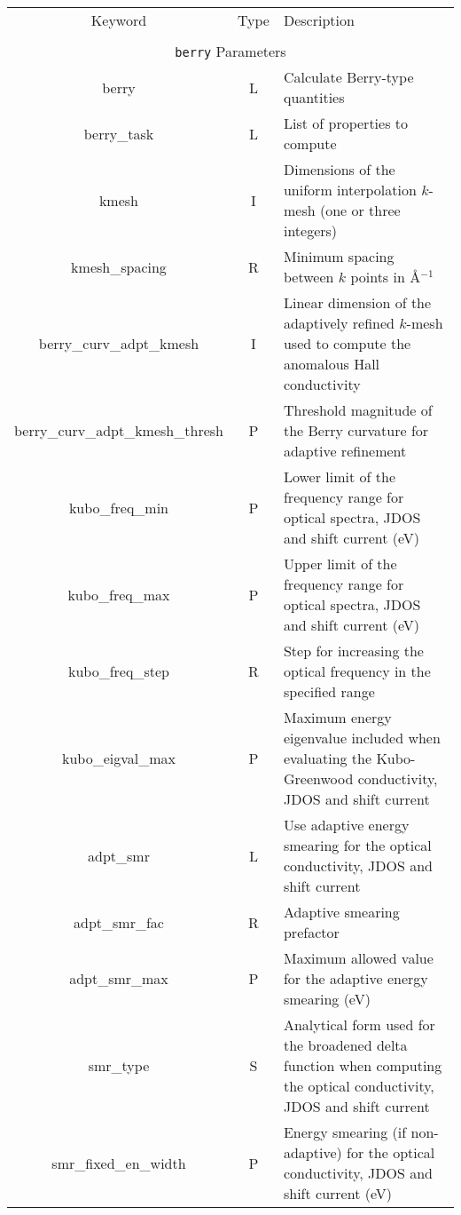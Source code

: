 \begin{table}[h!]
\begin{center}
\begin{tabular}{|c|c|p{6cm}|}
  \hline
  Keyword & Type & Description \\
  &      &             \\
  \hline\hline
  \multicolumn{3}{|c|}{{\tt berry} Parameters} \\
  \hline
  {\sc berry}  & L & Calculate Berry-type quantities \\
  {\sc berry\_task}& L  & List of properties to compute \\
  {\sc [berry\_]kmesh} & I & Dimensions of the uniform interpolation $k$-mesh 
  (one or three integers)\\ 
  {\sc [berry\_]kmesh\_spacing}& R & Minimum spacing between $k$ points in 
  \AA$^{-1}$\\
  {\sc berry\_curv\_adpt\_kmesh} & I & Linear dimension of the adaptively refined $k$-mesh used to compute the anomalous Hall conductivity\\ 
  {\sc berry\_curv\_adpt\_kmesh\_thresh} & P & Threshold magnitude
  of the Berry curvature for adaptive refinement\\ 
  {\sc kubo\_freq\_min} & P & Lower limit of the frequency range for
  optical spectra, JDOS and shift current (eV) \\
  {\sc kubo\_freq\_max}& P & Upper limit of the frequency range for
  optical spectra, JDOS and shift current (eV) \\
  {\sc kubo\_freq\_step}& R &  Step for increasing
the optical frequency in the specified range\\
  {\sc kubo\_eigval\_max}& P &  Maximum energy eigenvalue
  included when evaluating the Kubo-Greenwood conductivity, JDOS and shift current\\
  {\sc [kubo\_]adpt\_smr} & L & Use adaptive energy smearing for the 
  optical conductivity, JDOS and shift current \\
  {\sc [kubo\_]adpt\_smr\_fac} & R & Adaptive smearing prefactor \\
  {\sc[kubo\_]adpt\_smr\_max} & P & Maximum allowed value for the 
  adaptive energy smearing (eV) \\
  {\sc [kubo\_]smr\_type} & S & Analytical form used for the broadened delta function
  when computing the optical conductivity, JDOS and shift current\\  
  {\sc [kubo\_]smr\_fixed\_en\_width} & P  & Energy smearing (if non-adaptive)
  for the optical conductivity, JDOS and shift current (eV) \\

\end{tabular}
\end{center}
\end{table}
